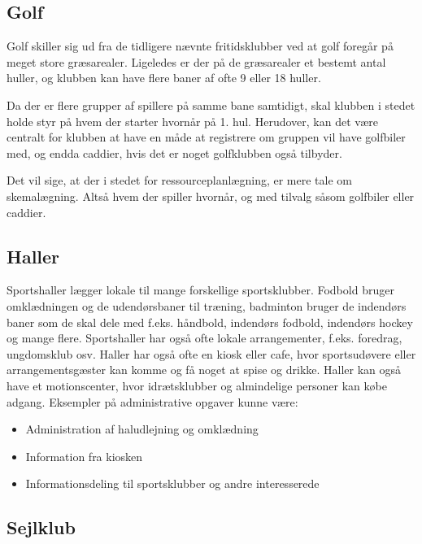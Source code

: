 \subsection{Golf}

Golf skiller sig ud fra de tidligere nævnte fritidsklubber ved at golf foregår på meget store græsarealer. Ligeledes er
der på de græsarealer et bestemt antal huller, og klubben kan have flere baner af ofte 9 eller 18 huller.

Da der er flere grupper af spillere på samme bane samtidigt, skal klubben i stedet holde styr på hvem der starter
hvornår på 1. hul. 
Herudover, kan det være centralt for klubben at have en måde at registrere om gruppen vil have
golfbiler med, og endda caddier, hvis det er noget golfklubben også tilbyder.

Det vil sige, at der i stedet for ressourceplanlægning, er mere tale om skemalægning. Altså hvem der spiller hvornår, og
med tilvalg såsom golfbiler eller caddier.


\subsection{Haller}

Sportshaller lægger lokale til mange forskellige sportsklubber. Fodbold bruger omklædningen og de udendørsbaner til
træning, badminton bruger de indendørs baner som de skal dele med f.eks. håndbold, indendørs fodbold, indendørs hockey
og mange flere. Sportshaller har også ofte lokale arrangementer, f.eks. foredrag, ungdomsklub osv. Haller har også ofte
en kiosk eller cafe, hvor sportsudøvere eller arrangementsgæster kan komme og få noget at spise og drikke. Haller kan
også have et motionscenter, hvor idrætsklubber og almindelige personer kan købe adgang\citep{spt_hal}. Eksempler på
administrative opgaver kunne være:

\begin{itemize}
\item Administration af haludlejning og omklædning 
\item Information fra kiosken
\item Informationsdeling til sportsklubber og andre interesserede
\end{itemize}

\subsection{Sejlklub}

